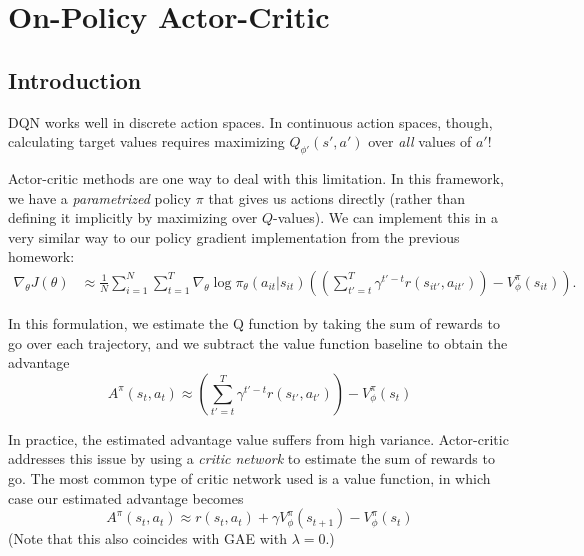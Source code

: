 \section{On-Policy Actor-Critic}
\subsection{Introduction}

DQN works well in discrete action spaces. In continuous action spaces, though, calculating target values requires maximizing $Q_{\phi'}(s', a')$ over \textit{all} values of $a'$!

Actor-critic methods are one way to deal with this limitation. In this framework, we have a \textit{parametrized} policy $\pi$ that gives us actions directly (rather than defining it implicitly by maximizing over $Q$-values). We can implement this in a very similar way to our policy gradient implementation from the previous homework:
\begin{align*}
\nabla_\theta J(\theta) &\approx \frac{1}{N} \sum_{i=1}^N \sum_{t=1}^T \nabla_\theta \log \pi_\theta(a_{it} | s_{it})\left(\left(\sum_{t'=t}^T \gamma^{t'-t} r(s_{it'}, a_{it'})\right) - V_\phi^\pi\left(s_{it}\right)\right).
\end{align*}

In this formulation, we estimate the Q function by taking the sum of rewards to go over each trajectory, and we subtract the value function baseline to obtain the advantage $$A^\pi(s_{t}, a_{t}) \approx \left(\sum_{t'=t}^T \gamma^{t'-t} r(s_{t'}, a_{t'})\right) - V_\phi^\pi\left(s_{t}\right)$$

In practice, the estimated advantage value suffers from high variance. Actor-critic addresses this issue by using a \textit{critic network} to estimate the sum of rewards to go. The most common type of critic network used is a value function, in which case our estimated advantage becomes
$$A^\pi(s_{t}, a_{t}) \approx r(s_{t}, a_{t}) + \gamma V_\phi^\pi\left(s_{t+1}\right) - V_\phi^\pi\left(s_{t}\right)$$
(Note that this also coincides with GAE with $\lambda = 0$.)

